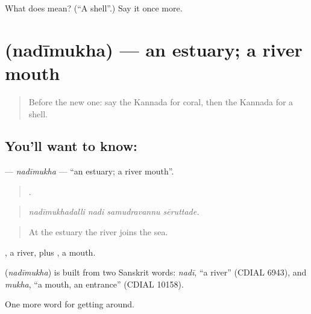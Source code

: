 \begin{tcolorbox}[breakable,colback=teal!4,colframe=teal!35!black,title={Before you move on}]
What does  mean? (\textquotedblleft{}A shell\textquotedblright{}.) Say it once more.
\end{tcolorbox}
\section[\texorpdfstring{\kn{ನದೀಮುಖ} (nadīmukha)}{ನದೀಮುಖ (nadīmukha)}]{ (nadīmukha) — an estuary; a river mouth}

\label{lesson:KA-C481-nadimukha}



\begin{quote}
Before the new one: say the Kannada for coral, then the Kannada for a shell.
\end{quote}

\subsection*{You'll want to know: }
\textbf{} — \emph{nadīmukha} — \textquotedblleft{}an estuary; a river mouth\textquotedblright{}.

\begin{quote}
   .
\end{quote}

\begin{quote}
\emph{nadīmukhadalli nadi samudravannu sēruttade.}
\end{quote}

\begin{quote}
At the estuary the river joins the sea.
\end{quote}

, a river, plus , a mouth.

\begin{cousinweb}
\textbf{} (\emph{nadīmukha}) is built from two Sanskrit words: \emph{nadī}, \textquotedblleft{}a river\textquotedblright{} (CDIAL 6943), and \emph{mukha}, \textquotedblleft{}a mouth, an entrance\textquotedblright{} (CDIAL 10158).
\end{cousinweb}

\begin{grammarlens}[title={What you've built}]
One more word for getting around.
\end{grammarlens}

